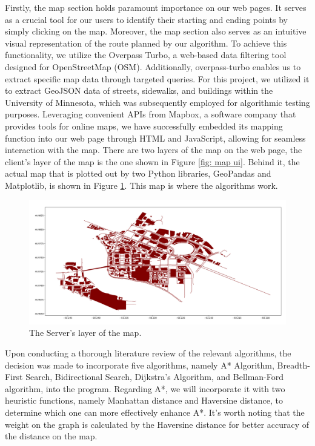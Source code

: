 \documentclass[12pt]{article}
\begin{document}
Firstly, the map section holds paramount importance on our web pages. It serves as a crucial tool for our users to identify their starting and ending points by simply clicking on the map. Moreover, the map section also serves as an intuitive visual representation of the route planned by our algorithm. To achieve this functionality, we utilize the Overpass Turbo, a web-based data filtering tool designed for OpenStreetMap (OSM). Additionally, overpass-turbo enables us to extract specific map data through targeted queries. For this project, we utilized it to extract GeoJSON data of streets, sidewalks, and buildings within the University of Minnesota, which was subsequently employed for algorithmic testing purposes. Leveraging convenient APIs from Mapbox, a software company that provides tools for online maps, we have successfully embedded its mapping function into our web page through HTML and JavaScript, allowing for seamless interaction with the map. There are two layers of the map on the web page, the client's layer of the map is the one shown in Figure \ref{fig: map ui}.  Behind it, the actual map that is plotted out by two Python libraries, GeoPandas and Matplotlib, is shown in Figure \ref{fig: server's layer}. This map is where the algorithms work.


\begin{figure}[H]
\centering
\includegraphics[scale=0.37]{images/complete_campus_map.png}
\caption{The Server's layer of the map.}
\label{fig: server's layer}
\end{figure}


Upon conducting a thorough literature review of the relevant algorithms, the decision was made to incorporate five algorithms, namely A* Algorithm, Breadth-First Search, Bidirectional Search, Dijkstra's Algorithm, and Bellman-Ford algorithm, into the program. Regarding A*, we will incorporate it with two heuristic functions, namely Manhattan distance and Haversine distance, to determine which one can more effectively enhance A*. It's worth noting that the weight on the graph is calculated by the Haversine distance for better accuracy of the distance on the map.
\end{document}
